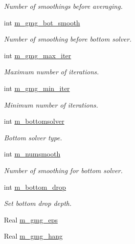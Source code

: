 \begin{DoxyCompactItemize}
\begin{DoxyCompactList}\small\item\em Number of smoothings before averaging. \end{DoxyCompactList}\item 
int \hyperlink{classeddington__sp1_a9d0b456a8cdada8636f8087f947528fe}{m\+\_\+gmg\+\_\+bot\+\_\+smooth}
\begin{DoxyCompactList}\small\item\em Number of smoothing before bottom solver. \end{DoxyCompactList}\item 
int \hyperlink{classeddington__sp1_aed92e46b2ea16a4e8aa3e35faeaf5153}{m\+\_\+gmg\+\_\+max\+\_\+iter}
\begin{DoxyCompactList}\small\item\em Maximum number of iterations. \end{DoxyCompactList}\item 
int \hyperlink{classeddington__sp1_a7d97061b784f9b1d477ac79b94292a73}{m\+\_\+gmg\+\_\+min\+\_\+iter}
\begin{DoxyCompactList}\small\item\em Minimum number of iterations. \end{DoxyCompactList}\item 
int \hyperlink{classeddington__sp1_ab9bb350b96167e92380f72890728cb24}{m\+\_\+bottomsolver}
\begin{DoxyCompactList}\small\item\em Bottom solver type. \end{DoxyCompactList}\item 
int \hyperlink{classeddington__sp1_aa17b377231e6868460691beea22cd47c}{m\+\_\+numsmooth}
\begin{DoxyCompactList}\small\item\em Number of smoothing for bottom solver. \end{DoxyCompactList}\item 
int \hyperlink{classeddington__sp1_abeeeb6469977bff3220d268dab6c8347}{m\+\_\+bottom\+\_\+drop}
\begin{DoxyCompactList}\small\item\em Set bottom drop depth. \end{DoxyCompactList}\item 
Real \hyperlink{classeddington__sp1_af5293cfeac66bcbef820da5d1afe2df1}{m\+\_\+gmg\+\_\+eps}
\item 
Real \hyperlink{classeddington__sp1_ae54481747a438bd1ce4678c404a22681}{m\+\_\+gmg\+\_\+hang}

\end{DoxyCompactItemize}

